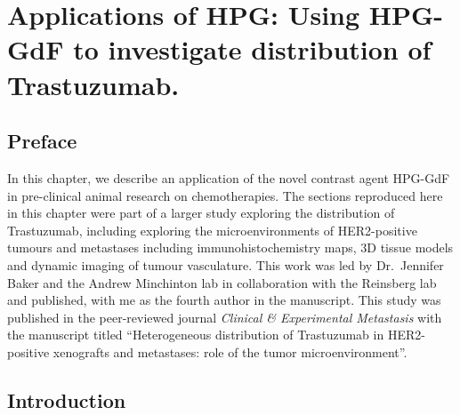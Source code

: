 

\chapter{Applications of HPG: Using \acs{HPG-GdF} to investigate distribution of Trastuzumab.}
\label{ch:HPG2}

\section{Preface}

In this chapter, we describe an application of the novel contrast agent \acs{HPG-GdF} in pre-clinical animal research on chemotherapies.
The sections reproduced here in this chapter were part of a larger study exploring the distribution of Trastuzumab, including exploring the microenvironments of \acs{HER2}-positive tumours and metastases including immunohistochemistry maps, 3D tissue models and dynamic imaging of tumour vasculature.
This work was led by Dr.\ Jennifer Baker and the Andrew Minchinton lab in collaboration with the Reinsberg lab and published, with me as the fourth author in the manuscript.
This study was published in the peer-reviewed journal \emph{Clinical \& Experimental Metastasis} with the manuscript titled ``Heterogeneous distribution of Trastuzumab in \acs{HER2}-positive xenografts and metastases: role of the tumor microenvironment''.

\section{Introduction}

